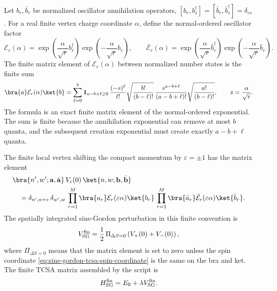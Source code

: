 Let \(b_r,\bar b_r\) be normalized oscillator annihilation operators,
\([b_r,b_s^\dagger]=[\bar b_r,\bar b_s^\dagger]=\delta_{rs}\).  For a real
finite vertex charge coordinate \(\alpha\), define the normal-ordered
oscillator factor
\begin{equation}
  \mathcal E_r(\alpha)
  =
  \exp\!\left(\frac{\alpha}{\sqrt r}b_r^\dagger\right)
  \exp\!\left(-\frac{\alpha}{\sqrt r}b_r\right),
  \qquad
  \bar{\mathcal E}_r(\alpha)
  =
  \exp\!\left(\frac{\alpha}{\sqrt r}\bar b_r^\dagger\right)
  \exp\!\left(-\frac{\alpha}{\sqrt r}\bar b_r\right).
  \label{eq:sine-gordon-tcsa-normal-ordered-factor}
\end{equation}
The finite matrix element of \(\mathcal E_r(\alpha)\) between normalized
number states is the finite sum
\begin{equation}
\begin{split}
  \bra{a}\mathcal E_r(\alpha)\ket{b}
  =
  \sum_{\ell=0}^{b}
  {\bf 1}_{a-b+\ell\geq0}\,
  \frac{(-s)^\ell}{\ell!}
  \sqrt{\frac{b!}{(b-\ell)!}}\,
  \frac{s^{a-b+\ell}}{(a-b+\ell)!}
  \sqrt{\frac{a!}{(b-\ell)!}},
  \qquad
  s=\frac{\alpha}{\sqrt r}.
\end{split}
  \label{eq:sine-gordon-tcsa-one-oscillator-matrix-element}
\end{equation}
The formula is an exact finite matrix element of the normal-ordered
exponential.  The sum is finite because the annihilation exponential can
remove at most \(b\) quanta, and the subsequent creation exponential must
create exactly \(a-b+\ell\) quanta.

The finite local vertex shifting the compact momentum by
\(\varepsilon=\pm1\) has the matrix element
\begin{equation}
\begin{split}
  &\bra{n',w';{\bf a},\bar{\bf a}}\,
  V_\varepsilon(0)\,
  \ket{n,w;{\bf b},\bar{\bf b}}
  \\
  &\quad =
  \delta_{n',n+\varepsilon}\,
  \delta_{w',w}\,
  \prod_{r=1}^{M}
  \bra{a_r}\mathcal E_r(\varepsilon\alpha)\ket{b_r}\,
  \prod_{r=1}^{M}
  \bra{\bar a_r}\bar{\mathcal E}_r(\varepsilon\alpha)\ket{\bar b_r}.
\end{split}
  \label{eq:sine-gordon-tcsa-local-vertex-matrix}
\end{equation}
The spatially integrated sine-Gordon perturbation in this finite convention
is
\begin{equation}
  V_{\rm SG}^{\rm fin}
  =
  \frac12\,
  \Pi_{\Delta S=0}
  \left(V_{+}(0)+V_{-}(0)\right),
  \label{eq:sine-gordon-tcsa-integrated-vertex}
\end{equation}
where \(\Pi_{\Delta S=0}\) means that the matrix element is set to zero
unless the spin coordinate \eqref{eq:sine-gordon-tcsa-spin-coordinate} is the
same on the bra and ket.  The finite TCSA matrix assembled by the script is
\begin{equation}
  H_{\rm SG}^{\rm fin}
  =
  E_0+\lambda V_{\rm SG}^{\rm fin}.
  \label{eq:sine-gordon-tcsa-finite-hamiltonian}
\end{equation}

